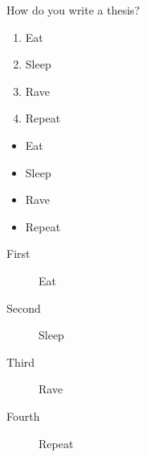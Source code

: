 \documentclass{beamer}
\begin{document}

\begin{frame}{How do you write a thesis?}

    \begin{enumerate}
        \item Eat
        \item Sleep
        \item Rave
        \item Repeat
    \end{enumerate}

    \begin{itemize}
        \item Eat
        \item Sleep
        \item Rave
        \item Repeat
    \end{itemize}

    \begin{description}
        \item[First] Eat
        \item[Second] Sleep
        \item[Third] Rave
        \item[Fourth] Repeat
    \end{description}
\end{frame}


\end{document}
